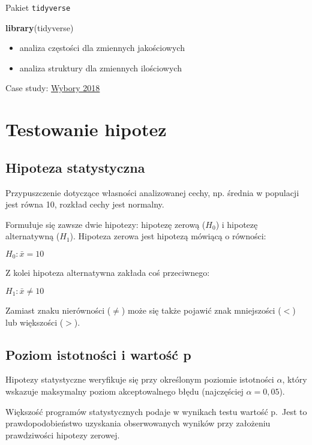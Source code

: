 \documentclass[]{book}
\newenvironment{Shaded}{\begin{snugshade}}{\end{snugshade}}
\newcommand{\KeywordTok}[1]{\textcolor[rgb]{0.13,0.29,0.53}{\textbf{#1}}}
\newcommand{\NormalTok}[1]{#1}
\providecommand{\tightlist}{%
  \setlength{\itemsep}{0pt}\setlength{\parskip}{0pt}}
\begin{document}
Pakiet \texttt{tidyverse}

\begin{Shaded}
\begin{Highlighting}[]
\KeywordTok{library}\NormalTok{(tidyverse)}
\end{Highlighting}
\end{Shaded}

\begin{itemize}
\tightlist
\item
  analiza częstości dla zmiennych jakościowych
\item
  analiza struktury dla zmiennych ilościowych
\end{itemize}

Case study: \href{data/wybory2018.xlsx}{Wybory 2018}

\chapter{Testowanie hipotez}\label{testowanie-hipotez}

\section{Hipoteza statystyczna}\label{hipoteza-statystyczna}

Przypuszczenie dotyczące własności analizowanej cechy, np. średnia w
populacji jest równa 10, rozkład cechy jest normalny.

Formułuje się zawsze dwie hipotezy: hipotezę zerową (\(H_0\)) i hipotezę
alternatywną (\(H_1\)). Hipoteza zerowa jest hipotezą mówiącą o
równości:

\(H_0: \bar{x}=10\)

Z kolei hipoteza alternatywna zakłada coś przeciwnego:

\(H_1: \bar{x}\neq 10\)

Zamiast znaku nierówności (\(\neq\)) może się także pojawić znak
mniejszości (\(<\)) lub większości (\(>\)).

\section{Poziom istotności i wartość
p}\label{poziom-istotnosci-i-wartosc-p}

Hipotezy statystyczne weryfikuje się przy określonym poziomie istotności
\(\alpha\), który wskazuje maksymalny poziom akceptowalnego błędu
(najczęściej \(\alpha=0,05\)).

Większość programów statystycznych podaje w wynikach testu wartość
p.~Jest to prawdopodobieństwo uzyskania obserwowanych wyników przy
założeniu prawdziwości hipotezy zerowej.
\end{document}
